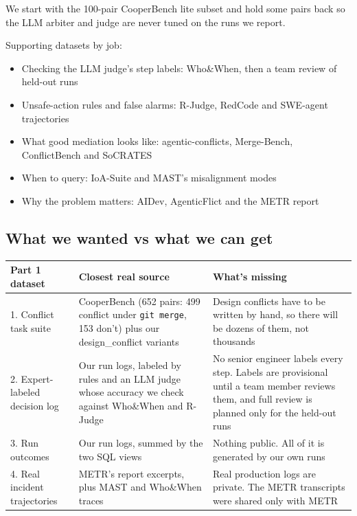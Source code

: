 \documentclass[11pt]{article}
\newcommand{\code}[1]{\texttt{#1}}
\begin{document}
We start with the 100-pair CooperBench lite subset and hold some pairs back so the LLM arbiter and judge are never tuned on the runs we report.

Supporting datasets by job:

\begin{itemize}
  \item Checking the LLM judge's step labels: Who\&When, then a team review of held-out runs
  \item Unsafe-action rules and false alarms: R-Judge, RedCode and SWE-agent trajectories
  \item What good mediation looks like: agentic-conflicts, Merge-Bench, ConflictBench and SoCRATES
  \item When to query: IoA-Suite and MAST's misalignment modes
  \item Why the problem matters: AIDev, AgenticFlict and the METR report
\end{itemize}

\subsection*{What we wanted vs what we can get}

{\small
\begin{tabularx}{\linewidth}{@{}L{3.6cm}YY@{}}
\toprule
\textbf{Part 1 dataset} & \textbf{Closest real source} & \textbf{What's missing} \\
. Conflict task suite & CooperBench (652 pairs: 499 conflict under \code{git merge}, 153 don't) plus our design\_conflict variants & Design conflicts have to be written by hand, so there will be dozens of them, not thousands \\
2. Expert-labeled decision log & Our run logs, labeled by rules and an LLM judge whose accuracy we check against Who\&When and R-Judge & No senior engineer labels every step. Labels are provisional until a team member reviews them, and full review is planned only for the held-out runs \\
3. Run outcomes & Our run logs, summed by the two SQL views & Nothing public. All of it is generated by our own runs \\
4. Real incident trajectories & METR's report excerpts, plus MAST and Who\&When traces & Real production logs are private. The METR transcripts were shared only with METR \\
\bottomrule
\end{tabularx}
}
\end{document}
